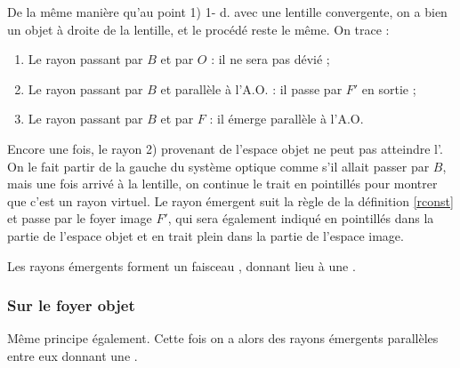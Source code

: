 \documentclass[10pt,a5paper,notitlepage]{book}
\begin{document}
De la même manière qu'au point \textcolor{capri}{1) 1- d.} avec une lentille
convergente, on a bien un objet à droite de la lentille, et le procédé reste
le même. On trace :

\begin{enumerate}
    \item Le rayon passant par $B$ et par $O$ : il ne sera pas dévié ;
    \item Le rayon passant par $B$ et parallèle à l'A.O. : il passe par $F'$ en
        sortie ;
    \item Le rayon passant par $B$ et par $F$ : il émerge parallèle à l'A.O.
\end{enumerate}

Encore une fois, le rayon \textcolor{brandeisblue}{2)} provenant de l'espace
objet ne peut pas atteindre l'. On le fait partir de la gauche
du système optique comme s'il allait passer par $B$, mais une fois arrivé à la
lentille, on continue le trait en pointillés pour montrer que c'est un rayon
virtuel. Le rayon émergent suit la règle de la définition \ref{rconst} et passe
par le foyer image $F'$, qui sera également indiqué en pointillés dans la partie
de l'espace objet et en trait plein dans la partie de l'espace image. \bigbreak

Les rayons émergents forment un faisceau , donnant lieu à une
.

\subsubsection{Sur le foyer objet}
Même principe également. Cette fois on a alors des rayons émergents parallèles
entre eux donnant une .
\end{document}
